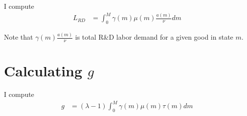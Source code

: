 \documentclass[12pt,english]{article}
\theoremstyle{remark}
\begin{document}
I compute
\begin{align*}
	L_{RD} &= \int_0^M \gamma(m) \mu(m) \frac{a(m)}{\nu} dm
\end{align*}

Note that $\gamma(m) \frac{a(m)}{\nu}$ is total R\&D labor demand for a given good in state $m$.

\section{Calculating $g$}

I compute
\begin{align*}
	g &= (\lambda - 1)\int_0^M \gamma(m) \mu(m) \tau(m) dm
\end{align*}
\end{document}
